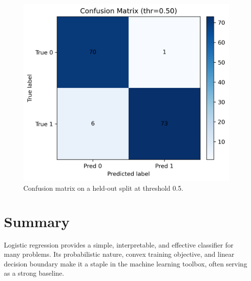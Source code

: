 \documentclass[11pt,a4paper]{article}
\begin{document}
\begin{figure}[H]
  \centering
  \includegraphics[width=0.55\linewidth]{confusion_matrix.png}
  \caption{Confusion matrix on a held-out split at threshold 0.5.}
  \label{fig:confusion}
\end{figure}

\FloatBarrier

\section{Summary}
Logistic regression provides a simple, interpretable, and effective classifier for many problems. Its probabilistic nature, convex training objective, and linear decision boundary make it a staple in the machine learning toolbox, often serving as a strong baseline.
\end{document}
